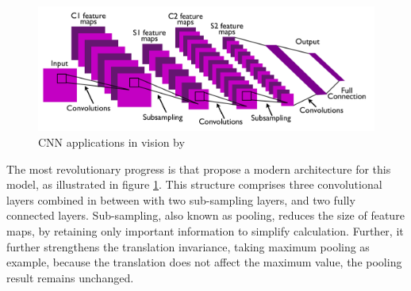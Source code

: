\begin{figure}[ht!]
    \centering
    \includegraphics[width=\textwidth]{literature/imgs/ext-lecun-cnn-arch.png}
    \caption{CNN applications in vision by \citet{lecun2010convolutional}}
    \label{fig:ext-lecun-cnn-arch}
\end{figure}

The most revolutionary progress is that \citet{lecun2010convolutional} propose a modern architecture for this model, as illustrated in figure \ref{fig:ext-lecun-cnn-arch}.
This structure comprises three convolutional layers combined in between with two sub-sampling layers, and two fully connected layers. Sub-sampling, also known as pooling, reduces the size of feature maps, by retaining only important information to simplify calculation.
Further, it further strengthens the translation invariance, taking maximum pooling as example, because the translation does not affect the maximum value, the pooling result remains unchanged.

\citet{he2015deep}

